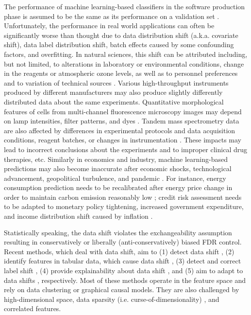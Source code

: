 \documentclass{article}
\begin{document}
The performance of machine learning-based classifiers in the software production phase is assumed to be the same as its performance on a validation set  \cite{dmlsbook2022}. Unfortunately, the  performance in real world applications can often be significantly worse than thought due to data distribution shift (a.k.a. covariate shift), data label distribution shift, batch effects \cite{Candela2009DatasetShift} caused by some confounding factors, and overfitting. In natural sciences, this shift can be attributed including, but not limited, to alterations in laboratory or environmental conditions, change in the reagents or atmospheric ozone levels, as well as to personnel preferences and to variation of technical sources \cite{leek2010tackling}. Various high-throughput instruments produced by different manufacturers may also produce slightly differently distributed data about the same experiments. Quantitative morphological features of cells from multi-channel fluorescence microscopy images may depend on lamp intensities, filter patterns, and dyes \cite{bray2016cell}. Tandem mass spectrometry data are also affected by differences in experimental protocols and data acquisition conditions, reagent batches, or changes in instrumentation \cite{phua2022perspectives, vcuklina2021diagnostics}. These impacts may lead to incorrect conclusions about the experiments and to improper clinical drug therapies, etc. Similarly in economics and industry, machine learning-based predictions may also become inaccurate after economic shocks, technological advancement, geopolitical turbulence, and pandemic \cite{ramey2016macroeconomic}. For instance, energy consumption prediction needs to be recalibrated after energy price change in order to maintain carbon emission reasonably low \cite{clement2023coping}; credit risk assessment needs to be adapted to monetary policy tightening, increased government expenditure, and income distribution shift caused by inflation \cite{kritzman2012regime,guo2023predict, Zhang:EECS-2021-262}.



Statistically speaking, the data shift violates the exchangeability assumption resulting in conservatively or liberally (anti-conservatively) biased FDR control. 
Recent methods, which deal with data shift, aim to (1) detect data shift  \cite{ dasu2009change}, (2) identify features in tabular data, which cause data shift \cite{kulinski2020feature}, (3) detect and correct label shift \cite{lipton2018detecting}, (4) provide explainability about data shift \cite{budhathoki2021did,kulinski2023towards}, and (5) aim to adapt to data shifts \cite{sui2024unleashing, zhang2021adaptive, zhang2022memo}, respectively. Most of these methods operate in the feature space and rely on data clustering or graphical causal models. They are also challenged by high-dimensional space, data sparsity (i.e. curse-of-dimensionality) \cite{donoho2000high}, and correlated features. 
\end{document}
